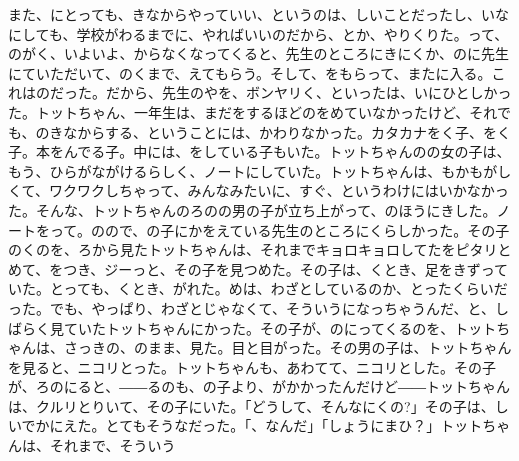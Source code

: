 また、にとっても、きなからやっていい、というのは、しいことだったし、いなにしても、学校がわるまでに、やればいいのだから、とか、やりくりた。って、のがく、いよいよ、からなくなってくると、先生のところにきにくか、のに先生にていただいて、のくまで、えてもらう。そして、をもらって、またに入る。これはのだった。だから、先生のやを、ボンヤリく、といったは、いにひとしかった。トットちゃん、一年生は、まだをするほどのをめていなかったけど、それでも、のきなからする、ということには、かわりなかった。カタカナをく子、をく子。本をんでる子。中には、をしている子もいた。トットちゃんのの女の子は、もう、ひらがながけるらしく、ノートにしていた。トットちゃんは、もかもがしくて、ワクワクしちゃって、みんなみたいに、すぐ、というわけにはいかなかった。そんな、トットちゃんのろのの男の子が立ち上がって、のほうにきした。ノートをって。のので、の子にかをえている先生のところにくらしかった。その子のくのを、ろから見たトットちゃんは、それまでキョロキョロしてたをピタリとめて、をつき、ジーっと、その子を見つめた。その子は、くとき、足をきずっていた。とっても、くとき、がれた。めは、わざとしているのか、とったくらいだった。でも、やっぱり、わざとじゃなくて、そういうになっちゃうんだ、と、しばらく見ていたトットちゃんにかった。その子が、のにってくるのを、トットちゃんは、さっきの、のまま、見た。目と目がった。その男の子は、トットちゃんを見ると、ニコリとった。トットちゃんも、あわてて、ニコリとした。その子が、ろのにると、――るのも、の子より、がかかったんだけど――トットちゃんは、クルリとりいて、その子にいた。「どうして、そんなにくの?」その子は、しいでかにえた。とてもそうなだった。「、なんだ」「しょうにまひ？」トットちゃんは、それまで、そういう\ruby